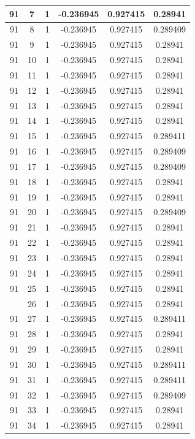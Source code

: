 \documentclass[12pt,a4paper]{article}
\numberwithin{equation}{section}
\numberwithin{figure}{section}
\numberwithin{table}{section}
\begin{document}
\begin{longtable}{|c|c|c|c|c|c|}
91 & 7 & 1 & -0.236945 & 0.927415 & 0.28941 \\ \hline
91 & 8 & 1 & -0.236945 & 0.927415 & 0.289409 \\ \hline
91 & 9 & 1 & -0.236945 & 0.927415 & 0.28941 \\ \hline
91 & 10 & 1 & -0.236945 & 0.927415 & 0.28941 \\ \hline
91 & 11 & 1 & -0.236945 & 0.927415 & 0.28941 \\ \hline
91 & 12 & 1 & -0.236945 & 0.927415 & 0.28941 \\ \hline
91 & 13 & 1 & -0.236945 & 0.927415 & 0.28941 \\ \hline
91 & 14 & 1 & -0.236945 & 0.927415 & 0.28941 \\ \hline
91 & 15 & 1 & -0.236945 & 0.927415 & 0.289411 \\ \hline
91 & 16 & 1 & -0.236945 & 0.927415 & 0.289409 \\ \hline
91 & 17 & 1 & -0.236945 & 0.927415 & 0.289409 \\ \hline
91 & 18 & 1 & -0.236945 & 0.927415 & 0.28941 \\ \hline
91 & 19 & 1 & -0.236945 & 0.927415 & 0.28941 \\ \hline
91 & 20 & 1 & -0.236945 & 0.927415 & 0.289409 \\ \hline
91 & 21 & 1 & -0.236945 & 0.927415 & 0.28941 \\ \hline
91 & 22 & 1 & -0.236945 & 0.927415 & 0.28941 \\ \hline
91 & 23 & 1 & -0.236945 & 0.927415 & 0.28941 \\ \hline
91 & 24 & 1 & -0.236945 & 0.927415 & 0.28941 \\ \hline
91 & 25 & 1 & -0.236945 & 0.927415 & 0.28941 \\ \hline
\pagebreak
91 & 26 & 1 & -0.236945 & 0.927415 & 0.28941 \\ \hline
91 & 27 & 1 & -0.236945 & 0.927415 & 0.289411 \\ \hline
91 & 28 & 1 & -0.236945 & 0.927415 & 0.28941 \\ \hline
91 & 29 & 1 & -0.236945 & 0.927415 & 0.28941 \\ \hline
91 & 30 & 1 & -0.236945 & 0.927415 & 0.289411 \\ \hline
91 & 31 & 1 & -0.236945 & 0.927415 & 0.289411 \\ \hline
91 & 32 & 1 & -0.236945 & 0.927415 & 0.289409 \\ \hline
91 & 33 & 1 & -0.236945 & 0.927415 & 0.28941 \\ \hline
91 & 34 & 1 & -0.236945 & 0.927415 & 0.28941 \\ \hline

\end{longtable}
\end{document}
